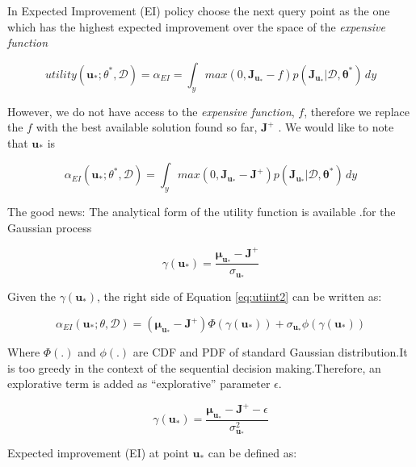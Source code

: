 \documentclass[]{elsarticle} %
\begin{document}
In Expected Improvement (EI) policy choose the next query point as the one which has the highest expected improvement over the space of the \emph{expensive function}

\begin{equation}
utility(\mathbf{u_\ast};\theta^{\ast},\mathcal{D})=\alpha_{EI}=\int_{y}^{}max(0,\mathbf{J_{u_*}}-f)p(\mathbf{J_{u_*}}|\mathbf{\mathcal{D},\theta^\ast}) \,dy
\label{eq:utiint}
\end{equation}

However, we do not have access to the \emph{expensive function}, \(f\), therefore we replace the \(f\) with the best available solution found so far, \(\mathbf{J}^+\) . We would like to note that \(\mathbf{u}_*\) is

\begin{equation}
\alpha_{EI}(\mathbf{u_\ast};\theta^\ast,\mathcal{D})=\int_{y}^{}max(0,\mathbf{J_{u_*}}-\mathbf{J^+})p(\mathbf{J_{u_*}}|\mathbf{\mathcal{D},\theta^\ast}) \,dy
\label{eq:utiint2}
\end{equation}

The good news: The analytical form of the utility function is available .for the Gaussian process

\begin{equation}
\gamma(\mathbf{u_*})=\frac{\mathbf{\mu_{u_\ast}}-\mathbf{J^+}}{\sigma_\mathbf{u_{\ast}}}
\label{eq:gamma}
\end{equation}

Given the \(\gamma(\mathbf{u_*})\), the right side of Equation \eqref{eq:utiint2} can be written as:

\begin{equation}
\alpha_{EI}(\mathbf{u_*};\theta,\mathcal{D})=(\mathbf{\mu_{u_\ast}}-\mathbf{J^+})\Phi(\gamma(\mathbf{u
_*})) + \sigma_{\mathbf{u_{\ast}}} \phi(\gamma(\mathbf{u_*}))
\label{eq:utility}
\end{equation}

Where \(\Phi(.)\) and \(\phi(.)\) are CDF and PDF of standard Gaussian distribution.It is too greedy in the context of the sequential decision making.Therefore, an explorative term is added as ``explorative'' parameter \(\epsilon\).

\begin{equation}
\gamma(\mathbf{u_*})=\frac{\mathbf{\mu_{u_\ast}}-\mathbf{J^+}-\epsilon}{\sigma^2_{\mathbf{u_{\ast}}}}
\label{eq:gamma_no_greed}
\end{equation}

Expected improvement (EI) at point \(\mathbf{u_*}\) can be defined as:
\end{document}
